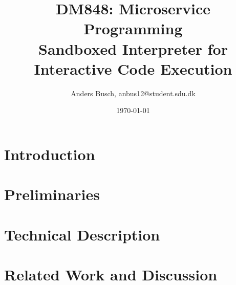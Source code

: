 \documentclass[12pt]{article}
\title{ \textbf{DM848}: Microservice Programming \\ {\Large Sandboxed Interpreter for Interactive Code Execution} }
\author{Anders Busch, anbus12@student.sdu.dk}
\date{\today \\ \hrulefill{}}
\begin{document}
\maketitle

\section{Introduction}

\section{Preliminaries}

\section{Technical Description}

\section{Related Work and Discussion}
\end{document}
